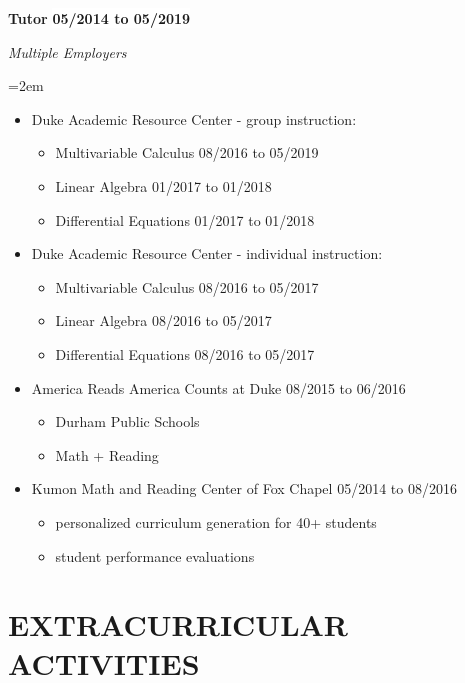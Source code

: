 \documentclass[paper=letter,fontsize=11pt]{scrartcl} %
\newcommand{\sepspace}{\vspace*{0em}}		%
\newcommand{\NewPart}[2]{\section*{\uppercase{#1} #2}}
\newcommand{\EducationEntry}[4]{
		\noindent \textbf{#1} \hfill      %
		\colorbox{White}{%
			\bf 
			\parbox{10em}{%
			\hfill\color{Black}#2}} \par  %
		\noindent \textit{#3} \par        %
		\noindent\hangindent=2em\hangafter=0 \small #4 %
		\normalsize \par}
\newcommand{\WorkEntry}[4]{				  %
		\noindent \textbf{#1} \hfill      %
		\colorbox{White}{\bf \color{Black}#2} \par  %
		\noindent \textit{#3} \par              %
		\noindent\hangindent=2em\hangafter=0 \small #4 %
		\normalsize \par}
\begin{document}
\sepspace
\WorkEntry{Tutor}{05/2014 to 05/2019}{Multiple Employers}
{	
	\begin{itemize}
	\setlength\itemsep{0em}
	\item Duke Academic Resource Center - group instruction:
		\begin{itemize}
			  \setlength\itemsep{0em}
			\item Multivariable Calculus \hfill 08/2016 to 05/2019
			\item Linear Algebra 		 \hfill 01/2017 to 01/2018
			\item Differential Equations \hfill 01/2017 to 01/2018
		\end{itemize}
	\item Duke Academic Resource Center - individual instruction:
		\begin{itemize}
			  \setlength\itemsep{0em}
			\item Multivariable Calculus \hfill 08/2016 to 05/2017
			\item Linear Algebra 		 \hfill 08/2016 to 05/2017
			\item Differential Equations \hfill 08/2016 to 05/2017
		\end{itemize}
	\item America Reads America Counts at Duke \hfill 08/2015 to 06/2016
		\begin{itemize}
			\item Durham Public Schools
			\item Math + Reading
		\end{itemize}
	\item Kumon Math and Reading Center of Fox Chapel \hfill 05/2014 to 08/2016
		\begin{itemize}
			\item personalized curriculum generation for 40+ students
			\item student performance evaluations
		\end{itemize}
	\end{itemize}
}

\NewPart{Extracurricular Activities}{}
\end{document}
